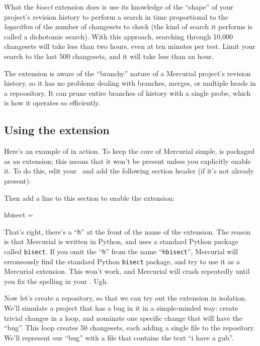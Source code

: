What the \emph{bisect} extension does is use its knowledge of the
``shape'' of your project's revision history to perform a search in
time proportional to the \emph{logarithm} of the number of changesets
to check (the kind of search it performs is called a dichotomic
search).  With this approach, searching through 10,000 changesets will
take less than two hours, even at ten minutes per test.  Limit your
search to the last 500 changesets, and it will take less than an hour.

The  extension is aware of the ``branchy'' nature of a
Mercurial project's revision history, so it has no problems dealing
with branches, merges, or multiple heads in a repoository.  It can
prune entire branches of history with a single probe, which is how it
operates so efficiently.

\subsection{Using the  extension}

Here's an example of  in action.  To keep the core of
Mercurial simple,  is packaged as an extension; this
means that it won't be present unless you explicitly enable it.  To do
this, edit your \hgrc\ and add the following section header (if it's
not already present):
\begin{codesample2}
  [extensions]
\end{codesample2}
Then add a line to this section to enable the extension:
\begin{codesample2}
  hbisect =
\end{codesample2}
\begin{note}
  That's right, there's a ``\texttt{h}'' at the front of the name of
  the  extension.  The reason is that Mercurial is
  written in Python, and uses a standard Python package called
  \texttt{bisect}.  If you omit the ``\texttt{h}'' from the name
  ``\texttt{hbisect}'', Mercurial will erroneously find the standard
  Python \texttt{bisect} package, and try to use it as a Mercurial
  extension.  This won't work, and Mercurial will crash repeatedly
  until you fix the spelling in your \hgrc.  Ugh.
\end{note}

Now let's create a repository, so that we can try out the
 extension in isolation.
We'll simulate a project that has a bug in it in a simple-minded way:
create trivial changes in a loop, and nominate one specific change
that will have the ``bug''.  This loop creates 50 changesets, each
adding a single file to the repository.  We'll represent our ``bug''
with a file that contains the text ``i have a gub''.

